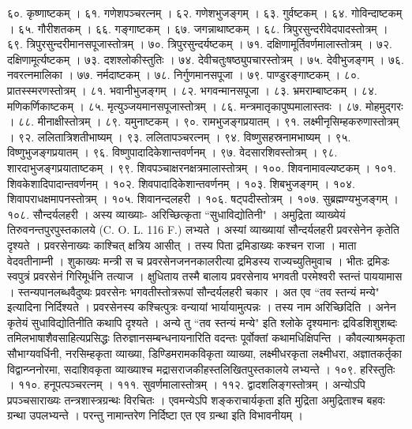 ६०. कृष्णाष्टकम् ।
६१. गणेशपञ्चरत्नम् ।
६२. गणेशभुजङ्गम् ।
६३. गुर्वष्टकम् ।
६४. गोविन्दाष्टकम् ।
६५. गौरीशतकम् ।
६६. गङ्गाष्टकम् ।
६७. जगन्नाथाष्टकम् ।
६८. त्रिपुरसुन्दरीवेदपादस्तोत्रम् ।
६९. त्रिपुरसुन्दरीमानसपूजास्तोत्रम् ।
७०. त्रिपुरसुन्दर्यष्टकम् ।
७१. दक्षिणामूर्तिवर्णमालास्तोत्रम् ।
७२. दक्षिणामूर्त्यष्टकम् ।
७३. दशश्लोकीस्तुतिः ।
७४. देवीचतुःषष्ठ्युपचारस्तोत्रम् ।
७५. देवीभुजङ्गम् ।
७६. नवरत्नमालिका ।
७७. नर्मदाष्टकम् ।
७८. निर्गुणमानसपूजा ।
७९. पाण्डुरङ्गाष्टकम् ।
८०. प्रातस्स्मरणस्तोत्रम् ।
८१. भवानीभुजङ्गम् ।
८२. भगवन्मानसपूजा ।
८३. भ्रमराम्बाष्टकम् ।
८४. मणिकर्णिकाष्टकम् ।
८५. मृत्युञ्जयमानसपूजास्तोत्रम् ।
८६. मन्त्रमातृकापुष्पमालास्तवः ।
८७. मोहमुद्गरः ।
८८. मीनाक्षीस्तोत्रम् ।
८९. यमुनाष्टकम् ।
९०. रामभुजङ्गप्रयातम् ।
९१. लक्ष्मीनृसिम्हकरुणास्तोत्रम् ।
९२. ललितात्रिशतीभाष्यम् ।
९३. ललितापञ्चरत्नम् ।
९४. विष्णुसहस्रनामभाष्यम् ।
९५. विष्णुभुजङ्गप्रयातम् ।
९६. विष्णुपादादिकेशान्तवर्णनम् ।
९७. वेदसारशिवस्तोत्रम् ।
९८. शारदाभुजङ्गप्रयाताष्टकम् ।
९९. शिवपञ्चाक्षरनक्षत्रमालास्तोत्रम् ।
१००. शिवनामावल्यष्टकम् ।
१०१. शिवकेशादिपादान्तवर्णनम् ।
१०२. शिवपादादिकेशान्तवर्णनम् ।
१०३. शिबभुजङ्गम् ।
१०४. शिवापराधक्षमापनस्तोत्रम् ।
१०५. शिवानन्दलहरी ।
१०६. षट्पदीस्तोत्रम् ।
१०७. सुब्रह्मण्यभुजङ्गम् ।
१०८. सौन्दर्यलहरी ।
अस्य व्याख्याः- अरिच्छित्कृता ``सुधाविद्योतिनी" । अमुद्रिता व्याख्येयं तिरुवनन्तपुरपुस्तकालये (C. O. L. 116 F.) लभ्यते । अस्यां व्याख्यायां सौन्दर्यलहरी प्रवरसेनेन कृतेति दृश्यते । प्रवरसेनाख्यः काश्चित् क्षत्रिय आसीत् । तस्य पिता द्रमिडाख्यः कश्चन राजा । माता वेदवतीनाम्नी । शुकाख्यः मन्त्री स च प्रवरसेनजननकालरीत्या द्रमिडस्य राज्यच्युतिमुवाच । भीतः द्रमिडः स्वपुत्रं प्रवरसेनं गिरिमूर्धनि तत्याज । क्षुधिताय तस्मै बालाय प्रवरसेनाय भगवती परमेश्वरी स्तन्तं पाययामास । स्तन्यपानलब्धवैदुष्यः प्रवरसेनः भगवतीस्तोत्ररूपां सौन्दर्यलहरी चकार । अत एव ``तव स्तन्यं मन्ये" इत्यादिना निर्दिश्यते । प्रवरसेनस्य कश्चित्पुत्रः वन्यायां भार्यायामुत्पन्नः । तस्य नाम अरिच्छिदिति । अनेन कृतेयं सुधाविद्योतिनीति कथापि दृश्यते ।
अन्ये तु ``तव स्तन्यं मन्ये" इति श्लोके दृश्यमानः द्रविडशिशुशब्दः तमिलभाषाशैवसाहित्यप्रसिद्धः तिरुज्ञानसम्बन्धनायनारिति वदन्तः पूर्वोक्तां कथामधिक्षिपन्ति ।
कौवल्याश्रमकृता सौभाग्यवर्धिनी, नरसिम्हकृता व्याख्या, डिण्डिमरामकविकृता व्याख्या, लक्ष्मीधरकृता लक्ष्मीधरा, अज्ञातकर्तृका विद्वान्प्ननोरमा, सदाशिवकृता व्याख्याश्च मद्रासराजकीहस्तलिखितपुस्तकालये लभ्यन्ते ।
१०९. हरिस्तुतिः ।
११०. हनूपत्पञ्चरत्नम् ।
१११. सुवर्णमालास्तोत्रम् ।
११२. द्वादशलिङ्गस्तोत्रम् ।
अन्योऽपि प्रपञ्चसाराख्यः तन्त्रशास्त्रग्रन्थः विरचितः । एवमन्येऽपि शङ्कराचार्यकृता इति मुद्रिता अमुद्रिताश्च बहवः ग्रन्था उपलभ्यन्ते । परन्तु नामान्तरेण निर्दिष्टा एत एव ग्रन्था इति विभावनीयम् ।
